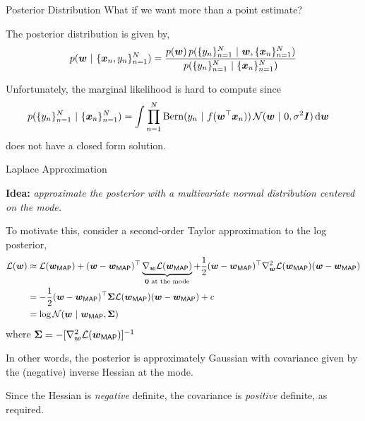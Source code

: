 \documentclass[aspectratio=169]{beamer}
\begin{document}
\begin{frame}{Posterior Distribution}
What if we want more than a point estimate? 

The posterior distribution is given by,
\begin{align}
    p(\boldsymbol{w} ~\vert~ \{\boldsymbol{x}_n, y_n\}_{n=1}^N) &= \frac{p(\boldsymbol{w}) \, p(\{y_n\}_{n=1}^N ~\vert~ \boldsymbol{w}, \{\boldsymbol{x}_n\}_{n=1}^N)}{p(\{y_n\}_{n=1}^N ~\vert~ \{\boldsymbol{x}_n\}_{n=1}^N)} \\
\end{align}

Unfortunately, the marginal likelihood is hard to compute since 
\begin{align}
    p(\{y_n\}_{n=1}^N ~\vert~ \{\boldsymbol{x}_n\}_{n=1}^N) &=
    \int \prod_{n=1}^N \mathrm{Bern}(y_n ~\vert~ f(\boldsymbol{w}^\top \boldsymbol{x}_n)) \, \mathcal{N}(\boldsymbol{w} ~\vert~ 0, \sigma^2 \boldsymbol{I}) \mathop{}\!\mathrm{d} \boldsymbol{w}
\end{align}
does not have a closed form solution.

\end{frame}

\begin{frame}{Laplace Approximation}

\textbf{Idea: } \textit{approximate the posterior with a multivariate normal distribution centered on the mode.}

To motivate this, consider a second-order Taylor approximation to the log posterior,
\begin{align}
    \mathcal{L}(\boldsymbol{w}) &\approx \mathcal{L}(\boldsymbol{w}_{\mathsf{MAP}}) + (\boldsymbol{w} - \boldsymbol{w}_{\mathsf{MAP}})^\top \underbrace{\nabla_{\boldsymbol{w}} \mathcal{L}(\boldsymbol{w}_{\mathsf{MAP}})}_{\boldsymbol{0} \text{ at the mode}} + \frac{1}{2} (\boldsymbol{w} - \boldsymbol{w}_{\mathsf{MAP}})^\top \nabla^2_{\boldsymbol{w}} \mathcal{L}(\boldsymbol{w}_{\mathsf{MAP}}) (\boldsymbol{w} - \boldsymbol{w}_{\mathsf{MAP}}) \\
    &= -\frac{1}{2} (\boldsymbol{w} - \boldsymbol{w}_{\mathsf{MAP}})^\top \boldsymbol{\Sigma} \mathcal{L}(\boldsymbol{w}_{\mathsf{MAP}}) (\boldsymbol{w} - \boldsymbol{w}_{\mathsf{MAP}}) + c \\
    &= \log \mathcal{N}(\boldsymbol{w} ~\vert~ \boldsymbol{w}_{\mathsf{MAP}}, \boldsymbol{\Sigma}) 
\end{align}
where $\boldsymbol{\Sigma} = - [\nabla^2_{\boldsymbol{w}} \mathcal{L}(\boldsymbol{w}_{\mathsf{MAP}})]^{-1} $

In other words, the posterior is approximately Gaussian with covariance given by the (negative) inverse Hessian at the mode.

Since the Hessian is \textit{negative} definite, the covariance is \emph{positive} definite, as required.
\end{frame}
\end{document}
